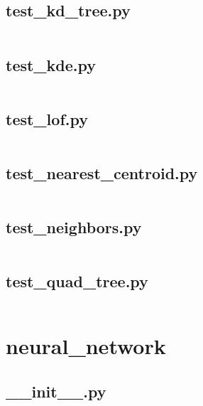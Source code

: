 \documentclass{article}
\begin{document}
\subsection{test\_kd\_tree.py}
\inputminted{python}{/home/dufferzafar/dev/@clones/scikit-learn/sklearn/neighbors/tests/test_kd_tree.py}
\newpage

\subsection{test\_kde.py}
\inputminted{python}{/home/dufferzafar/dev/@clones/scikit-learn/sklearn/neighbors/tests/test_kde.py}
\newpage

\subsection{test\_lof.py}
\inputminted{python}{/home/dufferzafar/dev/@clones/scikit-learn/sklearn/neighbors/tests/test_lof.py}
\newpage

\subsection{test\_nearest\_centroid.py}
\inputminted{python}{/home/dufferzafar/dev/@clones/scikit-learn/sklearn/neighbors/tests/test_nearest_centroid.py}
\newpage

\subsection{test\_neighbors.py}
\inputminted{python}{/home/dufferzafar/dev/@clones/scikit-learn/sklearn/neighbors/tests/test_neighbors.py}
\newpage

\subsection{test\_quad\_tree.py}
\inputminted{python}{/home/dufferzafar/dev/@clones/scikit-learn/sklearn/neighbors/tests/test_quad_tree.py}
\newpage

\section{neural\_network}

\subsection{\_\_init\_\_.py}
\inputminted{python}{/home/dufferzafar/dev/@clones/scikit-learn/sklearn/neural_network/__init__.py}
\newpage
\end{document}
